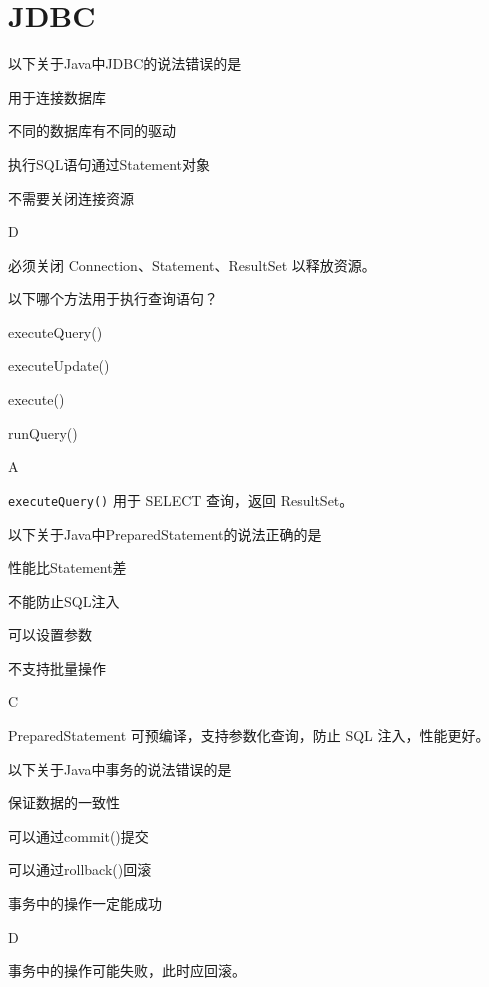 \section{JDBC}

\begin{question}
	以下关于Java中JDBC的说法错误的是
	\begin{options}
		\item 用于连接数据库
		\item 不同的数据库有不同的驱动
		\item 执行SQL语句通过Statement对象
		\item 不需要关闭连接资源
	\end{options}
	\begin{answer}
		D
	\end{answer}
	\begin{explanation}
		必须关闭 Connection、Statement、ResultSet 以释放资源。
	\end{explanation}
\end{question}

\begin{question}
	以下哪个方法用于执行查询语句？
	\begin{options}
		\item executeQuery()
		\item executeUpdate()
		\item execute()
		\item runQuery()
	\end{options}
	\begin{answer}
		A
	\end{answer}
	\begin{explanation}
		\texttt{executeQuery()} 用于 SELECT 查询，返回 ResultSet。
	\end{explanation}
\end{question}

\begin{question}
	以下关于Java中PreparedStatement的说法正确的是
	\begin{options}
		\item 性能比Statement差
		\item 不能防止SQL注入
		\item 可以设置参数
		\item 不支持批量操作
	\end{options}
	\begin{answer}
		C
	\end{answer}
	\begin{explanation}
		PreparedStatement 可预编译，支持参数化查询，防止 SQL 注入，性能更好。
	\end{explanation}
\end{question}

\begin{question}
	以下关于Java中事务的说法错误的是
	\begin{options}
		\item 保证数据的一致性
		\item 可以通过commit()提交
		\item 可以通过rollback()回滚
		\item 事务中的操作一定能成功
	\end{options}
	\begin{answer}
		D
	\end{answer}
	\begin{explanation}
		事务中的操作可能失败，此时应回滚。
	\end{explanation}
\end{question}
